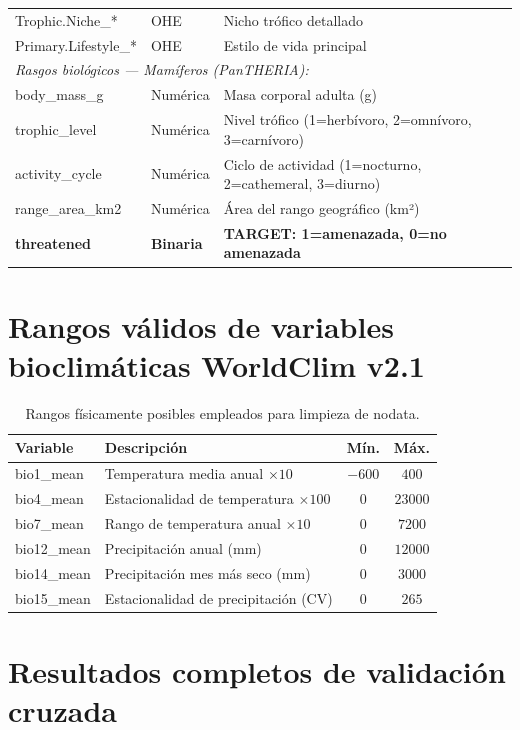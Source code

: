 \documentclass[12pt,a4paper]{article}
\begin{document}
\begin{longtable}{p{4.5cm}p{1.8cm}p{6.5cm}}
  Trophic.Niche\_*    & OHE        & Nicho trófico detallado \\
  Primary.Lifestyle\_* & OHE       & Estilo de vida principal \\
  \midrule
  \multicolumn{3}{l}{\textit{Rasgos biológicos --- Mamíferos (PanTHERIA):}} \\
  body\_mass\_g       & Numérica & Masa corporal adulta (g) \\
  trophic\_level      & Numérica & Nivel trófico (1=herbívoro, 2=omnívoro, 3=carnívoro) \\
  activity\_cycle     & Numérica & Ciclo de actividad (1=nocturno, 2=cathemeral, 3=diurno) \\
  range\_area\_km2    & Numérica & Área del rango geográfico (km²) \\
  \midrule
  \textbf{threatened} & \textbf{Binaria} & \textbf{TARGET: 1=amenazada, 0=no amenazada} \\
\end{longtable}

\section{Rangos válidos de variables bioclimáticas WorldClim v2.1}
\label{anx:worldclim}

\begin{table}[H]
  \centering\small
  \caption{Rangos físicamente posibles empleados para limpieza de nodata.}
  \begin{tabular}{llcc}
    \toprule
    \textbf{Variable} & \textbf{Descripción} & \textbf{Mín.} & \textbf{Máx.} \\
    \midrule
    bio1\_mean  & Temperatura media anual $\times 10$    & $-600$ & $400$  \\
    bio4\_mean  & Estacionalidad de temperatura $\times 100$ & $0$ & $23000$ \\
    bio7\_mean  & Rango de temperatura anual $\times 10$ & $0$ & $7200$ \\
    bio12\_mean & Precipitación anual (mm)               & $0$ & $12000$ \\
    bio14\_mean & Precipitación mes más seco (mm)        & $0$ & $3000$ \\
    bio15\_mean & Estacionalidad de precipitación (CV)   & $0$ & $265$ \\
    \bottomrule
  \end{tabular}
\end{table}

\section{Resultados completos de validación cruzada}
\label{anx:resultados_full}
\end{document}
